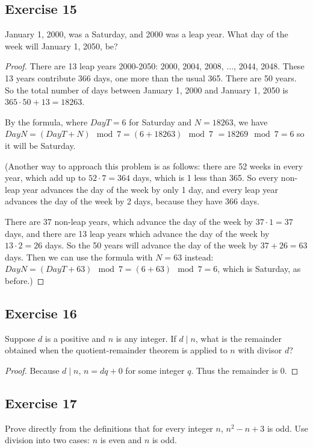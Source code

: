 \documentclass[14pt]{extarticle}
\begin{document}
\subsection{Exercise 15}
January 1, 2000, was a Saturday, and 2000 was a leap year. What day of the week will January 1, 2050, be?

\begin{proof}
    There are 13 leap years 2000-2050: 2000, 2004, 2008, $\ldots$, 2044, 2048. These 13 years contribute 366 days, one more than the usual 365. There are 50 years. So the total number of days between January 1, 2000 and January 1, 2050 is $365 \cdot 50 + 13 = 18263$.

    By the formula, where $DayT = 6$ for Saturday and $N = 18263$, we have $DayN = (DayT + N) \mod 7 = (6 + 18263) \mod 7$ $= 18269 \mod 7 = 6$ so it will be Saturday.

    (Another way to approach this problem is as follows: there are 52 weeks in every year, which add up to $52 \cdot 7 = 364$ days, which is 1 less than 365. So every non-leap year advances the day of the week by only 1 day, and every leap year advances the day of the week by 2 days, because they have 366 days.

    There are 37 non-leap years, which advance the day of the week by $37 \cdot 1 = 37$ days, and there are 13 leap years which advance the day of the week by $13 \cdot 2 = 26$ days. So the 50 years will advance the day of the week by $37 + 26 = 63$ days. Then we can use the formula with $N = 63$ instead: $DayN = (DayT + 63) \mod 7 = (6 + 63) \mod 7 = 6$, which is Saturday, as before.)
\end{proof}

\subsection{Exercise 16}
Suppose $d$ is a positive and $n$ is any integer. If $d \mid n$, what is the remainder obtained when the quotient-remainder theorem is applied to $n$ with divisor $d$?

\begin{proof}
    Because $d\mid n$, $n = dq + 0$ for some integer $q$. Thus the remainder is 0.
\end{proof}

\subsection{Exercise 17}
Prove directly from the definitions that for every integer $n$, $n^2-n + 3$ is odd. Use division into two cases: $n$ is even and $n$ is odd.
\end{document}
